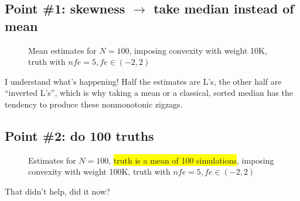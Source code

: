 \documentclass[11pt]{article}
\def \myFigPath {../../figures/}
\renewcommand{\[}{\begin{equation}}
\renewcommand{\]}{\end{equation}}
\def\mySmallFigScale{0.22}
\def\mySmallerFigScale{0.18}
\def\myTinyFigScale{0.16}
\begin{document}
\newpage 
\subsection*{Point \#1: skewness $\rightarrow$ take median instead of mean }

\begin{figure}[h!]
\caption{Mean estimates for $N=100$, imposing convexity with weight 10K, truth with $nfe=5, fe \in(-2,2)$}
\end{figure}
I understand what's happening! Half the estimates are L's, the other half are ``inverted L's'', which is why taking a mean or a classical, sorted median has the tendency to produce these nonmonotonic zigzags.

\subsection*{Point \#2: do 100 truths}
\begin{figure}[h!]
\hfill
{}
\caption{Estimates for $N=100$, \colorbox{yellow}{truth is a mean of 100 simulations}, imposing convexity with weight 100K, truth with $nfe=5, fe \in(-2,2)$}
\end{figure}
That didn't help, did it now?

\newpage 
\end{document}
